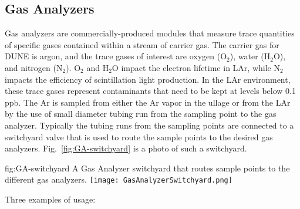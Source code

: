\subsection{Gas Analyzers}
\label{sec:fdsp-slow-cryo-gas-anlyz}

 Gas analyzers are commercially-produced modules that measure trace quantities of specific gases contained within a stream of carrier gas. The carrier gas for DUNE is argon, and the trace gases of interest are oxygen ($\text{O}_2$), water ($\text{H}_2\text{O}$), and nitrogen ($\text{N}_2$). $\text{O}_2$ and $\text{H}_2\text{O}$ impact the electron lifetime in LAr, while $\text{N}_2$ impacts the efficiency of scintillation light production. In the LAr environment, these trace gases represent contaminants that need to be kept at levels below 0.1 ppb.
The Ar is sampled from either the Ar vapor in the ullage or from the LAr by the use of small diameter tubing run from the sampling point to the gas analyzer. Typically the tubing runs from the sampling points are connected to a switchyard valve that is used to route the sample points to the desired gas analyzers. Fig.~\ref{fig:GA-switchyard} is a photo of such a switchyard.

\begin{dunefigure}{fig:GA-switchyard}
  {A Gas Analyzer switchyard that routes sample points to the different gas analyzers.}
  \texttt{[image: GasAnalyzerSwitchyard.png]}%
\end{dunefigure}

Three examples of usage:

